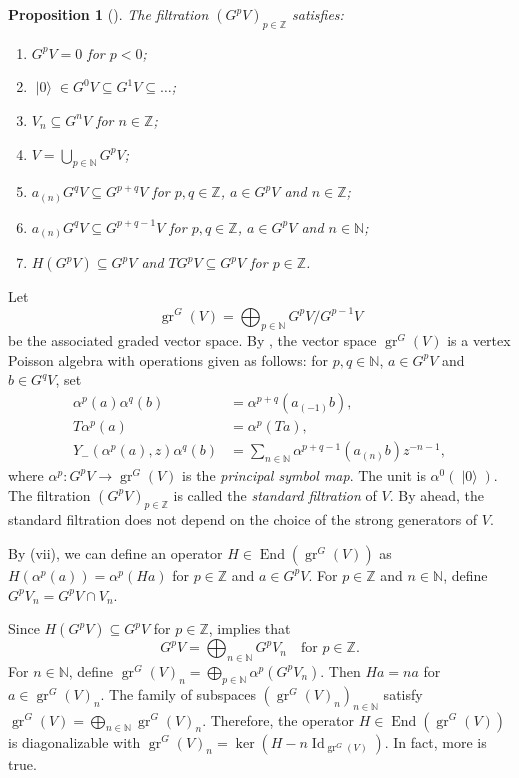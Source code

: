 \documentclass[a4paper, 12pt, reqno]{amsart}
\newtheorem{proposition}[theorem]{Proposition}
\theoremstyle{remark}
\numberwithin{equation}{subsection}
\DeclareMathOperator{\Id}{Id}
\DeclareMathOperator{\gr}{gr}
\DeclareMathOperator{\End}{End}
\DeclareMathOperator{\vac}{|0\rangle}
\begin{document}
\begin{proposition}[{\cite{li_vertex_2004}}]
  \label{prp:10}
  The filtration $(G^pV)_{p \in \mathbb{Z}}$ satisfies:
  \begin{enumerate}
  \item $G^pV = 0$ for $p < 0$;
  \item $\vac \in G^0V \subseteq G^1V \subseteq \dots$;
  \item $V_n \subseteq G^nV$ for $n \in \mathbb{Z}$;
  \item $V = \bigcup_{p \in \mathbb{N}}G^pV$;
  \item $a_{(n)}G^qV \subseteq G^{p + q}V$ for $p, q \in \mathbb{Z}$, $a \in G^pV$ and $n \in \mathbb{Z}$;
  \item $a_{(n)}G^qV \subseteq G^{p + q - 1}V$ for $p, q \in \mathbb{Z}$, $a \in G^pV$ and $n \in \mathbb{N}$;
  \item $H(G^pV) \subseteq G^pV$ and $TG^pV \subseteq G^pV$ for $p \in \mathbb{Z}$.
  \end{enumerate}
\end{proposition}

Let
\begin{equation*}
  \gr^G(V) = \bigoplus_{p \in \mathbb{N}}G^pV/G^{p - 1}V
\end{equation*}
be the associated graded vector space.
By \cite{li_vertex_2004}, the vector space $\gr^G(V)$ is a vertex Poisson algebra with operations given as follows: for $p, q \in \mathbb{N}$, $a \in G^pV$ and $b \in G^qV$, set
\begin{align*}
  \alpha^p(a)\alpha^q(b) &= \alpha^{p + q}(a_{(-1)}b), \\
  T\alpha^p(a) &= \alpha^p(Ta), \\
  Y_-(\alpha^p(a), z)\alpha^q(b) &= \sum_{n \in \mathbb{N}}\alpha^{p + q - 1}(a_{(n)}b)z^{-n - 1},
\end{align*}
where $\alpha^p: G^pV \to \gr^G(V)$ is the \emph{principal symbol map}.
The unit is $\alpha^0(\vac)$.
The filtration $(G^pV)_{p \in \mathbb{Z}}$ is called the \emph{standard filtration} of $V$.
By  ahead, the standard filtration does not depend on the choice of the strong generators of $V$.

By (vii), we can define an operator $H \in \End(\gr^G(V))$ as $H(\alpha^p(a)) = \alpha^p(Ha)$ for $p \in \mathbb{Z}$ and $a \in G^pV$.
For $p \in \mathbb{Z}$ and $n \in \mathbb{N}$, define $G^pV_n = G^pV \cap V_n$.

Since $H(G^pV) \subseteq G^pV$ for $p \in \mathbb{Z}$,  implies that
\begin{equation*}
  G^pV = \bigoplus_{n \in \mathbb{N}}G^pV_n \quad \text{for }p \in \mathbb{Z}.
\end{equation*}
For $n \in \mathbb{N}$, define $\gr^G(V)_n = \bigoplus_{p \in \mathbb{N}}\alpha^p(G^pV_n)$.
Then $Ha = na$ for $a \in \gr^G(V)_n$.
The family of subspaces $(\gr^G(V)_n)_{n \in \mathbb{N}}$ satisfy $\gr^G(V) = \bigoplus_{n \in \mathbb{N}}\gr^G(V)_n$.
Therefore, the operator $H \in \End(\gr^G(V))$ is diagonalizable with $\gr^G(V)_n = \ker(H - n\Id_{\gr^G(V)})$.
In fact, more is true.
\end{document}
